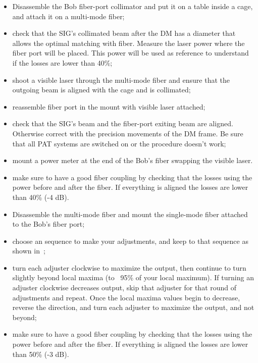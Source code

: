 \begin{itemize}
  \item Disassemble the Bob fiber-port collimator and put it on a table inside a cage, and attach it on a multi-mode fiber;
  \item check that the SIG's collimated beam after the DM has a diameter that allows the optimal matching with fiber. Measure the laser power where the fiber port will be placed. This power will be used as reference to understand if the losses are lower than 40\%;
  \item shoot a visible laser through the multi-mode fiber and ensure that the outgoing beam is aligned with the cage and is collimated;
  \item reassemble fiber port in the mount with visible laser attached;
  \item check that the SIG's beam and the fiber-port exiting beam are aligned. Otherwise correct with the precision movements of the DM frame. Be sure that all PAT systems are switched on or the procedure doesn't work;
  \item mount a power meter at the end of the Bob's fiber swapping the visible laser.
  \item make sure to have a good fiber coupling by checking that the losses using the power before and after the fiber. If everything is aligned the losses are lower than 40\% (-4 dB).
\end{itemize}

\begin{itemize}
  \item Disassemble the multi-mode fiber and mount the single-mode fiber attached to the Bob's fiber port;
  \item choose an sequence to make your adjustments, and keep to that sequence as shown in~;
  \item turn each adjuster clockwise to maximize the output, then continue to turn slightly beyond local maxima (to ~95\% of your local maximum). If turning an adjuster clockwise decreases output, skip that adjuster for that round of adjustments and repeat. Once the local maxima values begin to decrease, reverse the direction, and turn each adjuster to maximize the output, and not beyond;
  \item make sure to have a good fiber coupling by checking that the losses using the power before and after the fiber. If everything is aligned the losses are lower than 50\% (-3 dB).
\end{itemize}
